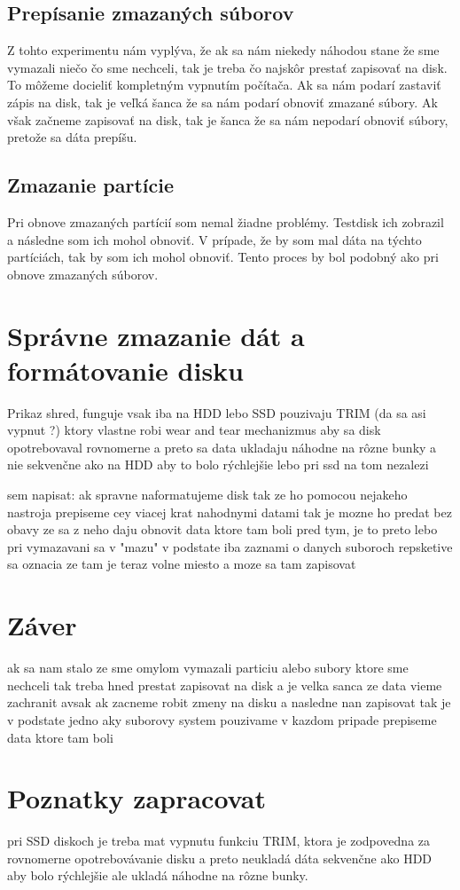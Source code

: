 \documentclass[12pt,oneside,slovak,a4paper]{article}
\begin{document}
\subsection{Prepísanie zmazaných súborov}
Z tohto experimentu nám vyplýva, že ak sa nám niekedy náhodou stane že sme vymazali niečo čo sme nechceli, tak je treba čo najskôr prestať zapisovať na disk. To môžeme docieliť kompletným vypnutím počítača. Ak sa nám podarí zastaviť zápis na disk, tak je veľká šanca že sa nám podarí obnoviť zmazané súbory. Ak však začneme zapisovať na disk, tak je šanca že sa nám nepodarí obnoviť súbory, pretože sa dáta prepíšu.

\subsection{Zmazanie partície}
Pri obnove zmazaných partícií som nemal žiadne problémy. Testdisk ich zobrazil a následne som ich mohol obnoviť. V prípade, že by som mal dáta na týchto partíciách, tak by som ich mohol obnoviť. Tento proces by bol podobný ako pri obnove zmazaných súborov.

\section{Správne zmazanie dát a formátovanie disku}
Prikaz shred, funguje vsak iba na HDD lebo SSD pouzivaju TRIM (da sa asi vypnut ?) ktory vlastne robi wear and tear mechanizmus aby sa disk opotrebovaval rovnomerne a preto sa data ukladaju náhodne na rôzne bunky a nie sekvenčne ako na HDD aby to bolo rýchlejšie lebo pri ssd na tom nezalezi

sem napisat: ak spravne naformatujeme disk tak ze ho pomocou nejakeho nastroja prepiseme cey viacej krat nahodnymi datami tak je mozne ho predat bez obavy ze sa z neho daju obnovit data ktore tam boli pred tym, je to preto lebo pri vymazavani sa v "mazu" v podstate iba zaznami o danych suboroch repsketive sa oznacia ze tam je teraz volne miesto a moze sa tam zapisovat

\section{Záver}
ak sa nam stalo ze sme omylom vymazali particiu alebo subory ktore sme nechceli tak treba hned prestat zapisovat na disk a je velka sanca ze data vieme zachranit avsak ak zacneme robit zmeny na disku a nasledne nan zapisovat tak je v podstate jedno aky suborovy system pouzivame v kazdom pripade prepiseme data ktore tam boli


\section{Poznatky zapracovat}

pri SSD diskoch je treba mat vypnutu funkciu TRIM, ktora je zodpovedna za rovnomerne opotrebovávanie disku a preto neukladá dáta sekvenčne ako HDD aby bolo rýchlejšie ale ukladá náhodne na rôzne bunky.





\end{document}
